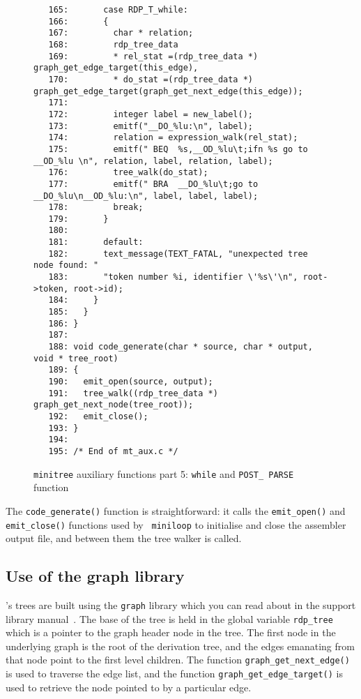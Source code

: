 \begin{figure}
\hspace*{-2.5cm}
\footnotesize
\begin{minipage}{30cm}
\begin{verbatim}
   165:       case RDP_T_while: 
   166:       {
   167:         char * relation; 
   168:         rdp_tree_data
   169:         * rel_stat =(rdp_tree_data *) graph_get_edge_target(this_edge), 
   170:         * do_stat =(rdp_tree_data *) graph_get_edge_target(graph_get_next_edge(this_edge)); 
   171:         
   172:         integer label = new_label(); 
   173:         emitf("__DO_%lu:\n", label); 
   174:         relation = expression_walk(rel_stat); 
   175:         emitf(" BEQ  %s,__OD_%lu\t;ifn %s go to __OD_%lu \n", relation, label, relation, label); 
   176:         tree_walk(do_stat); 
   177:         emitf(" BRA  __DO_%lu\t;go to __DO_%lu\n__OD_%lu:\n", label, label, label); 
   178:         break; 
   179:       }
   180:       
   181:       default: 
   182:       text_message(TEXT_FATAL, "unexpected tree node found: "
   183:       "token number %i, identifier \'%s\'\n", root->token, root->id); 
   184:     }
   185:   }
   186: }
   187: 
   188: void code_generate(char * source, char * output, void * tree_root)
   189: {
   190:   emit_open(source, output); 
   191:   tree_walk((rdp_tree_data *) graph_get_next_node(tree_root)); 
   192:   emit_close(); 
   193: }
   194: 
   195: /* End of mt_aux.c */
\end{verbatim}
\end{minipage}
\caption{{\tt minitree} auxiliary functions part 5: {\tt while} and {\tt POST\_\,PARSE} function}
\label{mt_aux.c:5}
\end{figure}

The \verb|code_generate()| function is straightforward: it calls the
\verb|emit_open()| and \verb|emit_close()| functions used by {\tt
miniloop} to initialise and close the assembler output file, and between
them the tree walker is called.

\subsection{Use of the graph library}

\rdp's trees are built using the {\tt graph} library which you can read about in the support
library manual~\cite{rdp:supp:1.5}. The base of the tree is held in the global 
variable \verb+rdp_tree+ which is a pointer to the graph header node in the tree. The first
node in the underlying graph is the root of the derivation tree, and the edges emanating
from that node point to the first level children. The function \verb+graph_get_next_edge()+
is used to traverse the edge list, and the function \verb+graph_get_edge_target()+ is used to
retrieve the node pointed to by a particular edge.


